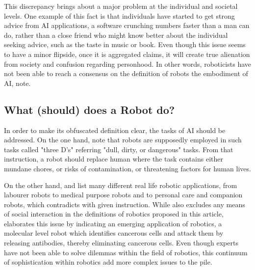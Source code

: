 \documentclass[man]{apa6}
\begin{document}

This discrepancy brings about a major problem at the individual and societal levels.
One example of this fact is that individuals have started to get strong advice from AI applications, a software crunching numbers faster than a man can do, rather than a close friend who might know better about the individual seeking advice, such as the taste in music or book.
Even though this issue seems to have a minor flipside, once it is aggregated  claims, it will create true alienation from society and confusion regarding personhood.
In other words, roboticists have not been able  to reach a consensus on the definition of robots the embodiment of AI,  note.
\par

\subsection{What (should) does a Robot do?}
In order to make its obfuscated definition clear, the tasks of AI should be addressed.
On the one hand,   note that robots are supposedly employed in such tasks called "three D's" referring "dull, dirty, or dangerous" tasks.
From that instruction, a robot should replace human where the task contains either mundane chores, or risks of contamination, or threatening factors for human lives.
\par 
\par
On the other hand,  and  list many different real life robotic applications, from labourer robots to medical purpose robots and to personal care and companion robots, which contradicts with given instruction.
While  also excludes any means of social interaction in the definitions of robotics proposed in this article,  elaborates this issue by indicating an emerging application of robotics, a molecular level robot which identifies cancerous cells and attack them by releasing antibodies, thereby eliminating cancerous cells.
Even though experts have not been able to solve dilemmas within the field of robotics, this continuum of sophistication within robotics add more complex issues to the pile.
\par
\end{document}
